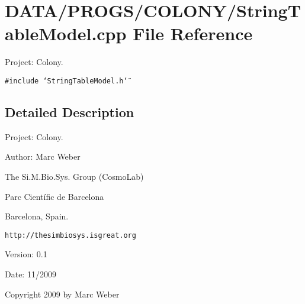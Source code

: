 \section{DATA/PROGS/COLONY/StringTableModel.cpp File Reference}
\label{StringTableModel_8cpp}
Project: Colony. 

{\tt \#include \char`\"{}StringTableModel.h\char`\"{}}\par


\subsection{Detailed Description}
Project: Colony. 

\begin{Desc}
\item[Author:]Marc Weber\par
 The Si.M.Bio.Sys. Group (CosmoLab)\par
 Parc Científic de Barcelona\par
 Barcelona, Spain.\par
 {\tt http://thesimbiosys.isgreat.org} \end{Desc}
\begin{Desc}
\item[Version:]0.1 \end{Desc}
\begin{Desc}
\item[Date:]11/2009\end{Desc}
Copyright 2009 by Marc Weber 